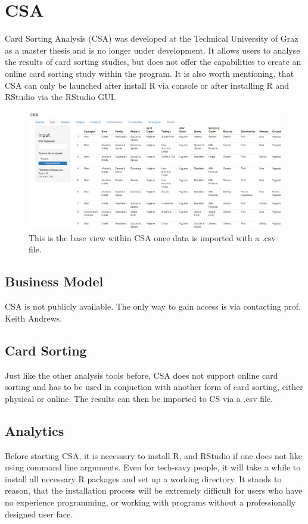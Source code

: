 \chapter{CSA}

\label{chap:CSA}
Card Sorting Analysis (CSA) was developed at the Technical University of Graz  
as a master thesis and is no longer under development. It allows users to 
analyse the results of card sorting studies, but does not offer the capabilities
to create an online card sorting study within the program. It is also worth 
mentioning, that CSA can only be launched after install R via console or after 
installing R and RStudio via the RStudio GUI.


\begin{figure}[tp] 
\centering
\includegraphics[keepaspectratio,width=\linewidth,height=\halfh]{images/csa-data.png}
\caption[CSA Application] { This is the base view within CSA
once data is imported with a .csv file.
 }
\label{fig:CSA1}
\end{figure}

\section{Business Model}
CSA is not publicly available. The only way to gain access is via contacting 
prof. Keith Andrews.

\section{Card Sorting}
Just like the other analysis tools before, CSA does not support online card 
sorting and has to be used in conjuction with another form of card sorting, 
either physical or online. The results can then be imported to CS via a .csv 
file.

\section{Analytics}
Before starting CSA, it is necessary to install R, and RStudio if one does not 
like using command line arguments. Even for tech-savy people, it will take a 
while to install all necessary R packages and set up a working directory. It 
stands to reason, that the installation process will be extremely difficult for 
users who have no experience programming, or working with programs without a 
professionally designed user face.

